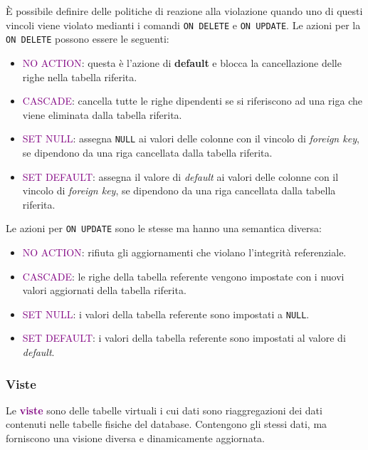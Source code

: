 È possibile definire delle politiche di reazione alla violazione quando uno di questi vincoli viene violato medianti i comandi \verb|ON DELETE| e
\verb|ON UPDATE|. Le azioni per la \verb|ON DELETE| possono essere le seguenti:
\begin{itemize}
    \item \textcolor{purple}{NO ACTION}: questa è l'azione di \textbf{default} e blocca la cancellazione
        delle righe nella tabella riferita.
    \item \textcolor{purple}{CASCADE}: cancella tutte le righe dipendenti se si riferiscono ad una riga che viene
        eliminata dalla tabella riferita.
    \item \textcolor{purple}{SET NULL}: assegna \verb|NULL| ai valori delle colonne con il vincolo di \emph{foreign key},
        se dipendono da una riga cancellata dalla tabella riferita.
    \item \textcolor{purple}{SET DEFAULT}: assegna il valore di \emph{default} ai valori delle colonne con il vincolo di \emph{foreign key},
        se dipendono da una riga cancellata dalla tabella riferita.
\end{itemize}

Le azioni per \verb|ON UPDATE| sono le stesse ma hanno una semantica diversa:
\begin{itemize}
    \item \textcolor{purple}{NO ACTION}: rifiuta gli aggiornamenti che violano l'integrità referenziale.
    \item \textcolor{purple}{CASCADE}: le righe della tabella referente vengono impostate con i nuovi valori aggiornati della tabella riferita.
    \item \textcolor{purple}{SET NULL}: i valori della tabella referente sono impostati a \verb|NULL|.
    \item \textcolor{purple}{SET DEFAULT}: i valori della tabella referente sono impostati al valore di \emph{default}.
\end{itemize}

\subsubsection{Viste}

Le \textbf{\textcolor{purple}{viste}} sono delle tabelle virtuali i cui dati sono
riaggregazioni dei dati contenuti nelle tabelle fisiche del database.
Contengono gli stessi dati, ma forniscono una visione diversa e dinamicamente aggiornata.

